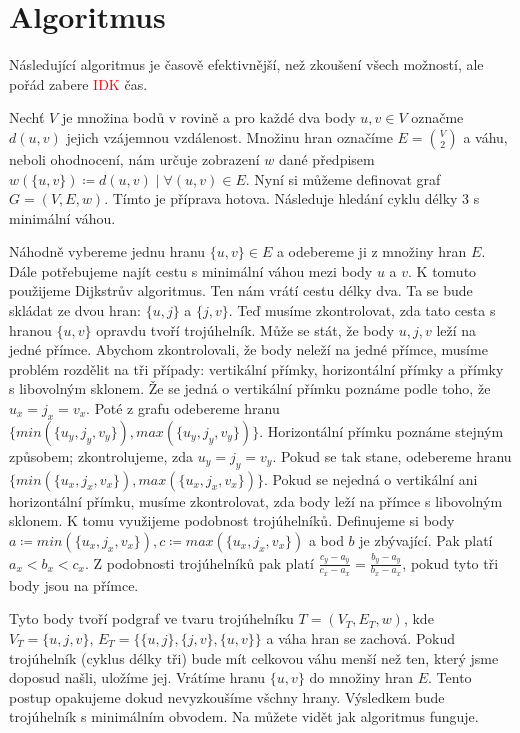 \section{Algoritmus}
\label{sec:algoritmus}
Následující algoritmus je časově efektivnější, než zkoušení všech možností, ale pořád zabere \textcolor{red}{IDK} čas. 

Nechť $V$ je množina bodů v rovině a pro každé dva body $u, v \in V$ označme $d(u, v)$ jejich vzájemnou vzdálenost. Množinu hran označíme $E = \binom{V}{2}$ a váhu, neboli ohodnocení, nám určuje zobrazení $w$ dané předpisem $w(\{u, v\}) \coloneqq d(u, v)\mid \forall (u, v) \in E$. Nyní si můžeme definovat graf $G = (V, E, w)$.
Tímto je příprava hotova. Následuje hledání cyklu délky 3 s minimální váhou.

Náhodně vybereme jednu hranu $\{u, v\} \in E$ a odebereme ji z množiny hran $E$. Dále potřebujeme najít cestu s minimální váhou mezi body $u$ a  $v$. K tomuto použijeme Dijkstrův algoritmus. Ten nám vrátí cestu délky dva. Ta se bude skládat ze dvou hran: $\{u, j\}$ a $\{j, v\}$. Teď musíme zkontrolovat, zda tato cesta s hranou $\{u, v\}$ opravdu tvoří trojúhelník. Může se stát, že body $u, j, v$ leží na jedné přímce. Abychom zkontrolovali, že body neleží na jedné přímce, musíme problém rozdělit na tři případy: vertikální přímky, horizontální přímky a přímky s libovolným sklonem. Že se jedná o vertikální přímku poznáme podle toho, že $u_x = j_x = v_x$. Poté z grafu odebereme hranu $\{min(\{u_y, j_y, v_y\}), max(\{u_y, j_y, v_y\})\}$. Horizontální přímku poznáme stejným způsobem; zkontrolujeme, zda $u_y = j_y = v_y$. Pokud se tak stane, odebereme hranu $\{min(\{u_x, j_x, v_x\}), max(\{u_x, j_x, v_x\})\}$. Pokud se nejedná o vertikální ani horizontální přímku, musíme zkontrolovat, zda body leží na přímce s libovolným sklonem. K tomu využijeme podobnost trojúhelníků. Definujeme si body $a \coloneqq min(\{u_x, j_x, v_x\}), c \coloneqq max(\{u_x, j_x, v_x\})$ a bod $b$ je zbývající. Pak platí $a_x < b_x < c_x$. Z podobnosti trojúhelníků pak platí $\frac{c_y - a_y}{c_x - a_x} = \frac{b_y - a_y}{b_x - a_x}$, pokud tyto tři body jsou na přímce.  


Tyto body tvoří podgraf ve tvaru trojúhelníku $T = (V_T, E_T, w)$, kde $V_T = \{u, j, v\}$, $E_T = \{\{u,j\}, \{j,v\}, \{u,v\}\}$ a váha hran se zachová. Pokud trojúhelník (cyklus délky tři) bude mít celkovou váhu menší než ten, který jsme doposud našli, uložíme jej.
Vrátíme hranu $\{u, v\}$ do množiny hran $E$. Tento postup opakujeme dokud nevyzkoušíme všchny hrany. Výsledkem bude trojúhelník s minimálním obvodem. Na  můžete vidět jak algoritmus funguje.

